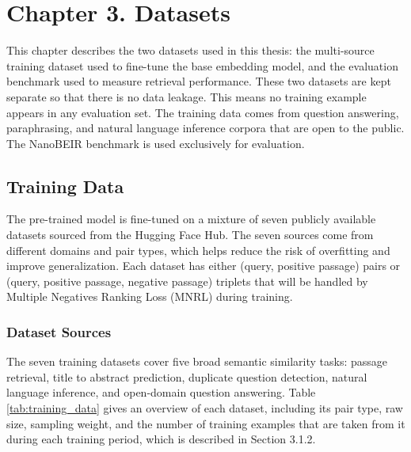 
\chapter{Chapter 3. Datasets}

This chapter describes the two datasets used in this thesis: the multi-source training dataset used to fine-tune the base embedding model, and the evaluation benchmark used to measure retrieval performance. These two datasets are kept separate so that there is no data leakage. This means no training example appears in any evaluation set. The training data comes from question answering, paraphrasing, and natural language inference corpora that are open to the public. The NanoBEIR benchmark is used exclusively for evaluation.

\section{Training Data}

The pre-trained model is fine-tuned on a mixture of seven publicly available datasets sourced from the Hugging Face Hub. The seven sources come from different domains and pair types, which helps reduce the risk of overfitting and improve generalization. Each dataset has either (query, positive passage) pairs or (query, positive passage, negative passage) triplets that will be handled by Multiple Negatives Ranking Loss (MNRL) during training.

\subsection{Dataset Sources}

The seven training datasets cover five broad semantic similarity tasks: passage retrieval, title to abstract prediction, duplicate question detection, natural language inference, and open-domain question answering. Table \ref{tab:training_data} gives an overview of each dataset, including its pair type, raw size, sampling weight, and the number of training examples that are taken from it during each training period, which is described in Section 3.1.2.

